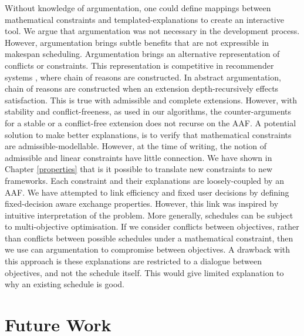 Without knowledge of argumentation, one could define mappings between mathematical constraints and templated-explanations to create an interactive tool. We argue that argumentation was not necessary in the development process. However, argumentation brings subtle benefits that are not expressible in makespan scheduling.
\linespace
Argumentation brings an alternative representation of conflicts or constraints. This representation is competitive in recommender systems \cite{recommend}, where chain of reasons are constructed. In abstract argumentation, chain of reasons are constructed when an extension depth-recursively effects satisfaction. This is true with admissible and complete extensions. However, with stability and conflict-freeness, as used in our algorithms, the counter-arguments for a stable or a conflict-free extension does not recurse on the AAF. A potential solution to make better explanations, is to verify that mathematical constraints are admissible-modellable. However, at the time of writing, the notion of admissible and linear constraints have little connection. 
\linespace
We have shown in Chapter \ref{properties} that is it possible to translate new constraints to new frameworks. Each constraint and their explanations are loosely-coupled by an AAF. We have attempted to link efficiency and fixed user decisions by defining fixed-decision aware exchange properties. However, this link was inspired by intuitive interpretation of the problem. More generally, schedules can be subject to multi-objective optimisation. If we consider conflicts between objectives, rather than conflicts between possible schedules under a mathematical constraint, then we use can argumentation to compromise between objectives. A drawback with this approach is these explanations are restricted to a dialogue between objectives, and not the schedule itself. This would give limited explanation to why an existing schedule is good.

\section{Future Work}

